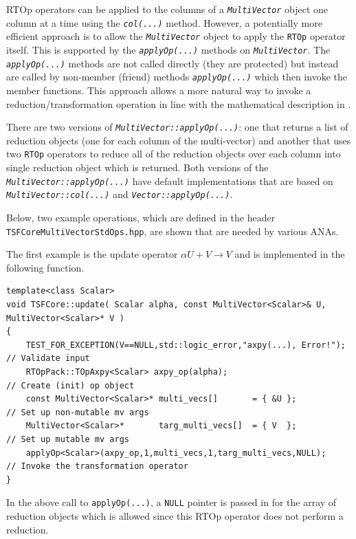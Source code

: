 RTOp operators can be applied to the columns of a
\texttt{\textit{Multi\-Vector}} object one column at a time
using the \texttt{\textit{col(...)}} method.  However, a potentially
more efficient approach is to allow the
\texttt{\textit{Multi\-Vector}} object to apply the \texttt{RTOp} operator itself.
This is supported by the \texttt{\textit{applyOp(\-...)}} methods on
\texttt{\textit{Multi\-Vector}}.  The \texttt{\textit{applyOp(\-...)}} methods are not
called directly (they are protected) but instead are called by
non-member (friend) methods \texttt{\textit{applyOp(\-...)}} which then
invoke the member functions.  This
approach allows a more natural way to invoke a
reduction/transformation operation in line with the mathematical
description in \cite{ref:rtop_toms}.

There are two versions of
\texttt{\textit{Multi\-Vector\-::applyOp(\-...)}}: one that returns a list
of reduction objects (one for each column of the multi-vector) and
another that uses two \texttt{RTOp} operators to reduce all of the
reduction objects over each column into single reduction object which
is returned.  Both versions of the
\texttt{\textit{Multi\-Vector\-::applyOp(\-...)}} have default implementations
that are based on \texttt{\textit{Multi\-Vector\-::col(...)}} and
\texttt{\textit{Vector\-::applyOp(\-...)}}.

Below, two example operations, which are defined in the header
\texttt{TSFCore\-Multi\-Vector\-Std\-Ops.hpp}, are shown that are needed
by various ANAs.

The first example is the update operator $\alpha U + V \rightarrow V$
and is implemented in the following function.

{\scriptsize\begin{verbatim}
template<class Scalar>
void TSFCore::update( Scalar alpha, const MultiVector<Scalar>& U, MultiVector<Scalar>* V )
{
    TEST_FOR_EXCEPTION(V==NULL,std::logic_error,"axpy(...), Error!");    // Validate input
    RTOpPack::TOpAxpy<Scalar> axpy_op(alpha);                         // Create (init) op object
    const MultiVector<Scalar>* multi_vecs[]       = { &U };           // Set up non-mutable mv args
    MultiVector<Scalar>*       targ_multi_vecs[]  = { V  };           // Set up mutable mv args
    applyOp<Scalar>(axpy_op,1,multi_vecs,1,targ_multi_vecs,NULL);     // Invoke the transformation operator
}
\end{verbatim}}

\noindent In the above call to \texttt{applyOp(\-...)}, a \texttt{NULL} pointer is
passed in for the array of reduction objects which is allowed since
this RTOp operator does not perform a reduction.


